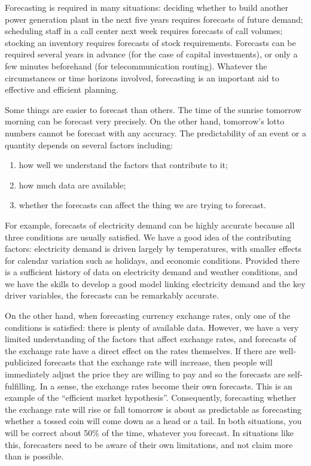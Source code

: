 \documentclass[]{book}
\providecommand{\tightlist}{%
  \setlength{\itemsep}{0pt}\setlength{\parskip}{0pt}}
\begin{document}
Forecasting is required in many situations: deciding whether to build another power generation plant in the next five years requires forecasts of future demand; scheduling staff in a call center next week requires forecasts of call volumes; stocking an inventory requires forecasts of stock requirements. Forecasts can be required several years in advance (for the case of capital investments), or only a few minutes beforehand (for telecommunication routing). Whatever the circumstances or time horizons involved, forecasting is an important aid to effective and efficient planning.

Some things are easier to forecast than others. The time of the sunrise tomorrow morning can be forecast very precisely. On the other hand, tomorrow's lotto numbers cannot be forecast with any accuracy. The predictability of an event or a quantity depends on several factors including:

\begin{enumerate}
\def\labelenumi{\arabic{enumi}.}
\tightlist
\item
  how well we understand the factors that contribute to it;
\item
  how much data are available;
\item
  whether the forecasts can affect the thing we are trying to forecast.
\end{enumerate}

For example, forecasts of electricity demand can be highly accurate because all three conditions are usually satisfied. We have a good idea of the contributing factors: electricity demand is driven largely by temperatures, with smaller effects for calendar variation such as holidays, and economic conditions. Provided there is a sufficient history of data on electricity demand and weather conditions, and we have the skills to develop a good model linking electricity demand and the key driver variables, the forecasts can be remarkably accurate.

On the other hand, when forecasting currency exchange rates, only one of the conditions is satisfied: there is plenty of available data. However, we have a very limited understanding of the factors that affect exchange rates, and forecasts of the exchange rate have a direct effect on the rates themselves. If there are well-publicized forecasts that the exchange rate will increase, then people will immediately adjust the price they are willing to pay and so the forecasts are self-fulfilling. In a sense, the exchange rates become their own forecasts. This is an example of the ``efficient market hypothesis''. Consequently, forecasting whether the exchange rate will rise or fall tomorrow is about as predictable as forecasting whether a tossed coin will come down as a head or a tail. In both situations, you will be correct about 50\% of the time, whatever you forecast. In situations like this, forecasters need to be aware of their own limitations, and not claim more than is possible.
\end{document}
